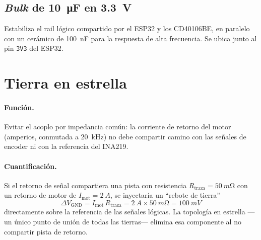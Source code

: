 \documentclass[11pt,letterpaper]{article}
\begin{document}
\subsection{\emph{Bulk} de \texorpdfstring{\SI{10}{\micro F}}{10 uF} en \texorpdfstring{\SI{3.3}{V}}{3.3 V}}
Estabiliza el rail lógico compartido por el ESP32 y los CD40106BE, en paralelo con
un cerámico de \SI{100}{nF} para la respuesta de alta frecuencia. Se ubica junto al
pin \texttt{3V3} del ESP32.

\section{Tierra en estrella}
\paragraph{Función.} Evitar el acoplo por impedancia común: la corriente de retorno
del motor (amperios, conmutada a \SI{20}{kHz}) no debe compartir camino con las
señales de encoder ni con la referencia del INA219.

\paragraph{Cuantificación.} Si el retorno de señal compartiera una pista con
resistencia $R_\text{traza}=\SI{50}{m\ohm}$ con un retorno de motor de
$I_\text{mot}=\SI{2}{A}$, se inyectaría un ``rebote de tierra''
\begin{equation}
  \Delta V_\text{GND} = I_\text{mot}\,R_\text{traza}
  = \SI{2}{A}\times\SI{50}{m\ohm} = \SI{100}{mV}
\end{equation}
directamente sobre la referencia de las señales lógicas. La topología en estrella
—un único punto de unión de todas las tierras— elimina esa componente al no
compartir pista de retorno.

\end{document}
